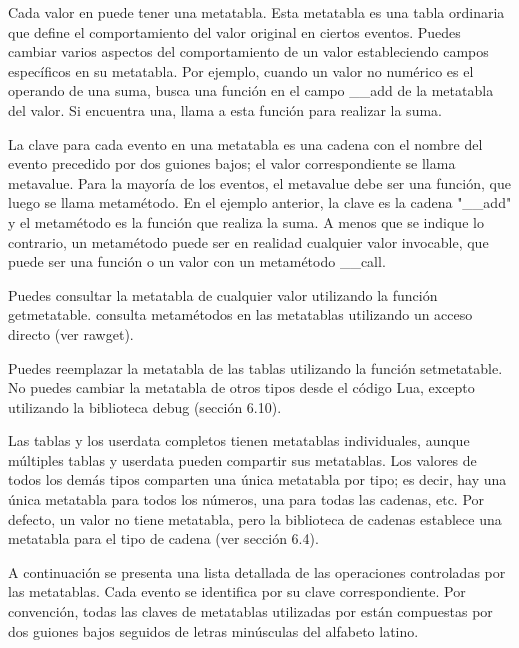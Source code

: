 Cada valor en  puede tener una metatabla. Esta metatabla es una tabla  ordinaria que define el comportamiento del valor original en ciertos eventos. Puedes cambiar varios aspectos del comportamiento de un valor estableciendo campos específicos en su metatabla. Por ejemplo, cuando un valor no numérico es el operando de una suma,  busca una función en el campo \_\_add de la metatabla del valor. Si encuentra una,  llama a esta función para realizar la suma.

La clave para cada evento en una metatabla es una cadena con el nombre del evento precedido por dos guiones bajos; el valor correspondiente se llama metavalue. Para la mayoría de los eventos, el metavalue debe ser una función, que luego se llama metamétodo. En el ejemplo anterior, la clave es la cadena "\_\_add" y el metamétodo es la función que realiza la suma. A menos que se indique lo contrario, un metamétodo puede ser en realidad cualquier valor invocable, que puede ser una función o un valor con un metamétodo \_\_call.

Puedes consultar la metatabla de cualquier valor utilizando la función getmetatable.  consulta metamétodos en las metatablas utilizando un acceso directo (ver rawget).

Puedes reemplazar la metatabla de las tablas utilizando la función setmetatable. No puedes cambiar la metatabla de otros tipos desde el código Lua, excepto utilizando la biblioteca debug (sección 6.10).

Las tablas y los userdata completos tienen metatablas individuales, aunque múltiples tablas y userdata pueden compartir sus metatablas. Los valores de todos los demás tipos comparten una única metatabla por tipo; es decir, hay una única metatabla para todos los números, una para todas las cadenas, etc. Por defecto, un valor no tiene metatabla, pero la biblioteca de cadenas establece una metatabla para el tipo de cadena (ver sección 6.4).

A continuación se presenta una lista detallada de las operaciones controladas por las metatablas. Cada evento se identifica por su clave correspondiente. Por convención, todas las claves de metatablas utilizadas por  están compuestas por dos guiones bajos seguidos de letras minúsculas del alfabeto latino.


